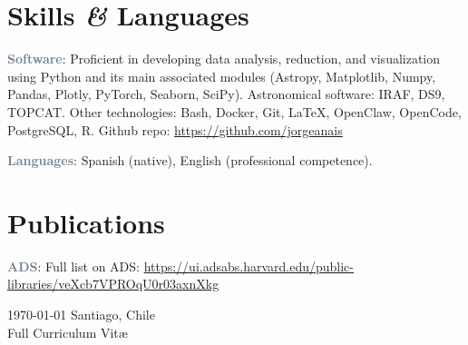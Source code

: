 \documentclass[10pt, a4paper]{article}
\newcommand{\amper}{{\itshape\addfontfeatures{Scale=.95}\&}}
\newcommand{\skillitem}[2]{
    \noindent\textbf{\textcolor{SlateGray}{#1}}: #2\par\vspace{0.2cm}
}
\begin{document}
\section*{Skills \amper{} Languages}
\skillitem{Software}{Proficient in developing data analysis, reduction, and visualization using Python and its main associated modules (Astropy, Matplotlib, Numpy, Pandas, Plotly, PyTorch, Seaborn, SciPy). Astronomical software: IRAF, DS9, TOPCAT. Other technologies: Bash, Docker, Git, \LaTeX, OpenClaw, OpenCode, PostgreSQL, R. Github repo: \url{https://github.com/jorgeanais}}
\skillitem{Languages}{Spanish (native), English (professional competence).}

\section*{Publications}
\skillitem{ADS}{Full list on ADS: \url{https://ui.adsabs.harvard.edu/public-libraries/veXcb7VPROqU0r03axnXkg}}

\vspace{1cm}
\begin{center}
{\small \today\- \textbullet\- Santiago, Chile}\\
{\scriptsize Full Curriculum Vit\ae}
\end{center}
\end{document}
